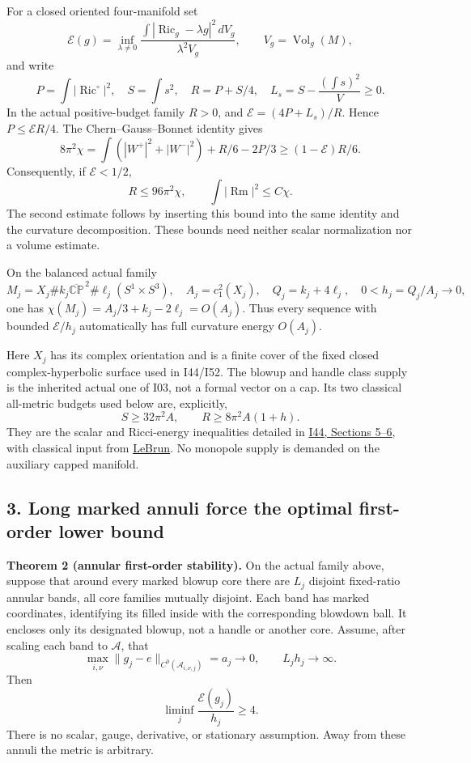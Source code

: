\documentclass[
  10pt,
]{article}
\begin{document}
For a closed oriented four-manifold set \[
 \mathcal E(g)=\inf_{\lambda\ne0}
   \frac{\int|\operatorname{Ric}_g-\lambda g|^2\,dV_g}{\lambda^2V_g},
 \qquad V_g=\operatorname{Vol}_g(M),
\] and write \[
 P=\int|\operatorname{Ric}^{\circ}|^2,\quad
 S=\int s^2,\quad R=P+S/4,\quad
 L_s=S-\frac{(\int s)^2}{V}\ge0 .
\] In the actual positive-budget family \(R>0\), and
\(\mathcal E=(4P+L_s)/R\). Hence \(P\le\mathcal E R/4\). The
Chern--Gauss--Bonnet identity gives \[
 8\pi^2\chi
 =\int(|W^+|^2+|W^-|^2)+R/6-2P/3
 \ge(1-\mathcal E)R/6.                               \tag{2.1}
\] Consequently, if \(\mathcal E<1/2\), \[
 R\le96\pi^2\chi,\qquad
                   \int|\operatorname{Rm}|^2\le C\chi. \tag{2.2}
\] The second estimate follows by inserting this bound into the same
identity and the curvature decomposition. These bounds need neither
scalar normalization nor a volume estimate.

On the balanced actual family \[
 M_j=X_j\# k_j\overline{\mathbb {CP}}^{\,2}
           \#\ell_j(S^1\times S^3),\quad
 A_j=c_1^2(X_j),\quad Q_j=k_j+4\ell_j,\quad 0<h_j=Q_j/A_j\to0,
\] one has \(\chi(M_j)=A_j/3+k_j-2\ell_j=O(A_j)\). Thus every sequence
with bounded \(\mathcal E/h_j\) automatically has full curvature energy
\(O(A_j)\).

Here \(X_j\) has its complex orientation and is a finite cover of the
fixed closed complex-hyperbolic surface used in I44/I52. The blowup and
handle class supply is the inherited actual one of I03, not a formal
vector on a cap. Its two classical all-metric budgets used below are,
explicitly, \[
             S\ge32\pi^2A,\qquad R\ge8\pi^2A(1+h).
\] They are the scalar and Ricci-energy inequalities detailed in
\href{20260927_covering_geometry_and_sharp_subfamilies.md}{I44, Sections
5--6}, with classical input from
\href{https://arxiv.org/html/math/0003068}{LeBrun}. No monopole supply
is demanded on the auxiliary capped manifold.

\hypertarget{long-marked-annuli-force-the-optimal-first-order-lower-bound}{%
\subsection{3. Long marked annuli force the optimal first-order lower
bound}\label{long-marked-annuli-force-the-optimal-first-order-lower-bound}}

\textbf{Theorem 2 (annular first-order stability).} On the actual family
above, suppose that around every marked blowup core there are \(L_j\)
disjoint fixed-ratio annular bands, all core families mutually disjoint.
Each band has marked coordinates, identifying its filled inside with the
corresponding blowdown ball. It encloses only its designated blowup, not
a handle or another core. Assume, after scaling each band to
\(\mathcal A\), that \[
 \max_{i,\nu}\|g_j-e\|_{C^0(\mathcal A_{i,\nu,j})}
          =a_j\longrightarrow0,\qquad
                         L_jh_j\longrightarrow\infty. \tag{3.1}
\] Then \[
                       \liminf_j\frac{\mathcal E(g_j)}{h_j}\ge4.
                                                               \tag{3.2}
\] There is no scalar, gauge, derivative, or stationary assumption. Away
from these annuli the metric is arbitrary.
\end{document}
